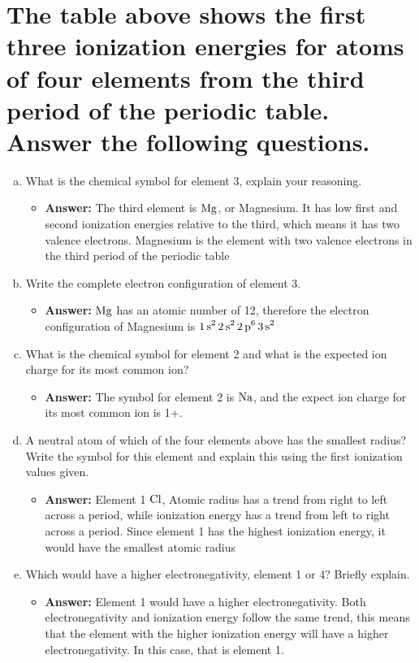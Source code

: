 \documentclass[11pt]{article}
\begin{document}
\section{The table above shows the first three ionization energies for atoms of four elements from the third period of the periodic table. Answer the following questions.}
\label{sec:org621a44b}
\begin{enumerate}[(a)]
\item What is the chemical symbol for element 3, explain your reasoning.
\begin{itemize}
\item \textbf{Answer:} The third element is \(\ce{Mg}\), or Magnesium. It has low first and
second ionization energies relative to the third, which means it has
two valence electrons. Magnesium is the element with two valence
electrons in the third period of the periodic table
\end{itemize}

\item Write the complete electron configuration of element 3.
\begin{itemize}
\item \textbf{Answer:} \(\ce{Mg}\) has an atomic number of 12, therefore the electron configuration
of Magnesium is \(\ce{1s^2 2s^2 2p^6 3s^2}\)
\end{itemize}

\item What is the chemical symbol for element 2 and what is the expected ion charge for its most common ion?
\begin{itemize}
\item \textbf{Answer:} The symbol for element 2 is \(\ce{Na}\), and the expect ion charge for its most common ion is 1+.
\end{itemize}

\item A neutral atom of which of the four elements above has the smallest radius? Write the symbol for this element and explain this using the first ionization values given.
\begin{itemize}
\item \textbf{Answer:} Element 1 \(\ce{Cl}\), Atomic radius has a trend from right to left across a period, while ionization energy has a trend from left to right across a period. Since element 1 has the highest ionization energy, it would have the smallest atomic radius
\end{itemize}

\item Which would have a higher electronegativity, element 1 or 4? Briefly explain.
\begin{itemize}
\item \textbf{Answer:} Element 1 would have a higher electronegativity. Both electronegativity and ionization energy follow the same trend, this means that the element with the higher ionization energy will have a higher electronegativity. In this case, that is element 1.
\end{itemize}


\end{enumerate}
\end{document}
